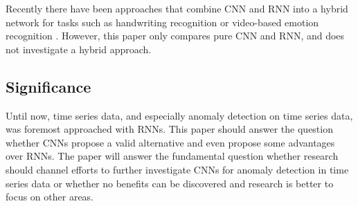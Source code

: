 Recently there have been approaches that combine CNN and RNN into a hybrid network for tasks such as handwriting recognition or video-based emotion recognition \parencite{Dutta2018} \parencite{Fan2016}. However, this paper only compares pure CNN and RNN, and does not investigate a hybrid approach.


\subsection{Significance}

Until now, time series data, and especially anomaly detection on time series data, was foremost approached with RNNs. This paper should answer the question whether CNNs propose a valid alternative and even propose some advantages over RNNs. The paper will answer the fundamental question whether research should channel efforts to further investigate CNNs for anomaly detection in time series data or whether no benefits can be discovered and research is better to focus on other areas. 

